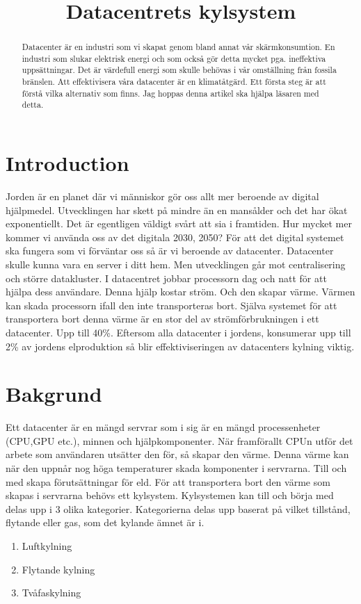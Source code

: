 \documentclass[conference,a4paper]{IEEEtran}
\begin{document}
\title{Datacentrets kylsystem}
\author{
}
\maketitle
\begin{abstract}
Datacenter är en industri som vi skapat genom bland annat vår skärmkonsumtion. En industri
som slukar elektrisk energi och som också gör detta mycket pga. ineffektiva uppsättningar.
Det är värdefull energi som skulle behövas i vår omställning från fossila bränslen. Att effektivisera våra datacenter
är en klimatåtgärd. Ett första steg är att förstå vilka alternativ som finns. Jag hoppas denna artikel
ska hjälpa läsaren med detta.  
\end{abstract}
\section{Introduction}
Jorden är en planet där vi människor gör oss allt mer beroende av digital hjälpmedel. 
Utvecklingen har skett på mindre än en mansålder och det har ökat exponentiellt. Det är
egentligen väldigt svårt att sia i framtiden. Hur mycket mer kommer vi använda oss av 
det digitala 2030, 2050? För att det digital systemet ska fungera som vi förväntar oss så är vi
beroende av datacenter. Datacenter skulle kunna vara en server i ditt hem. Men utvecklingen
går mot centralisering och större datakluster. I datacentret jobbar processorn dag och natt
för att hjälpa dess användare. Denna hjälp kostar ström. Och den skapar värme. Värmen kan 
skada processorn ifall den inte transporteras bort. Själva systemet för att transportera bort
denna värme är en stor del av strömförbrukningen i ett datacenter. Upp till 40\%. Eftersom 
alla datacenter i jordens, konsumerar upp till 2\% av jordens elproduktion så blir effektiviseringen 
av datacenters kylning viktig. 
\section{Bakgrund}
Ett datacenter är en mängd servrar som i sig är en mängd processenheter (CPU,GPU etc.), minnen och hjälpkomponenter. 
När framförallt CPUn utför det arbete som användaren utsätter den för, så skapar den värme. Denna värme kan när 
den uppnår nog höga temperaturer skada komponenter i servrarna. Till och med skapa förutsättningar för eld. 
För att transportera bort den värme som skapas i servrarna behövs ett kylsystem. Kylsystemen kan till 
och börja med delas upp i 3 olika kategorier. Kategorierna delas upp baserat på vilket tillstånd, 
flytande eller gas, som det kylande ämnet är i. 
\begin{enumerate}
    \item Luftkylning
    \item Flytande kylning 
    \item Tvåfaskylning
\end{enumerate}
\end{document}
